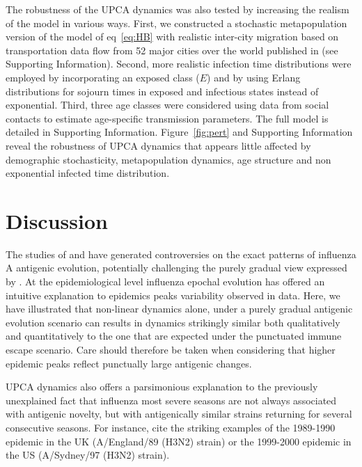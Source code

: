The robustness of the UPCA dynamics was also tested by increasing the
realism of the model in various ways.  First, we constructed a
stochastic metapopulation version of the model of eq~\eqref{eq:HB}
with realistic inter-city migration based on transportation data flow
from 52 major cities over the world published in \citet{Grais2003}
(see Supporting Information). Second, more realistic infection time
distributions were employed by incorporating an exposed class ($E$)
and by using Erlang distributions for sojourn times in exposed and
infectious states instead of exponential. Third, three age classes
were considered using \citet{Wallinga2006} data from social contacts
to estimate age-specific transmission parameters. The full model is
detailed in Supporting Information.  Figure~\ref{fig:pert} and
Supporting Information reveal the robustness of UPCA dynamics that
appears little affected by demographic stochasticity, metapopulation
dynamics, age structure and non exponential infected time
distribution.


\section{Discussion}
\label{sec:discussion}

The studies of \citet{Smith2004, Koelle2006, Wolf2006, Shih2007} and
\citet{Suzuki2008} have generated controversies on the exact patterns
of influenza A antigenic evolution, potentially challenging the purely
gradual view expressed by \citet{Pease1987}.  At the epidemiological
level influenza epochal evolution has offered an intuitive explanation
to epidemics peaks variability observed in data.  Here, we have
illustrated that non-linear dynamics alone, under a purely gradual
antigenic evolution scenario can results in dynamics strikingly
similar both qualitatively and quantitatively to the one that are
expected under the punctuated immune escape scenario.  Care should
therefore be taken when considering that higher epidemic peaks
reflect punctually large antigenic changes.

UPCA dynamics also offers a parsimonious explanation to the previously
unexplained fact that influenza most severe seasons are not always
associated with antigenic novelty, but with antigenically similar
strains returning for several consecutive seasons. For instance,
\citet{Viboud2006b} cite the striking examples of the 1989-1990
epidemic in the UK (A/England/89 (H3N2) strain) or the 1999-2000
epidemic in the US (A/Sydney/97 (H3N2) strain).

